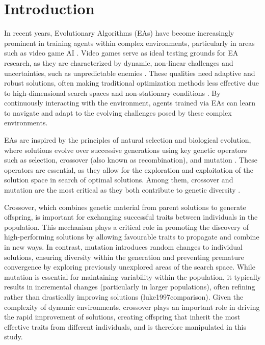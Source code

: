 
\section{Introduction}\label{sec:introduction}
In recent years, Evolutionary Algorithms (EAs) have become increasingly prominent in training agents within complex environments, particularly in areas such as video game AI \cite{lucas2006evolutionary}.
Video games serve as ideal testing grounds for EA research, as they are characterized by dynamic, non-linear challenges and uncertainties, such as unpredictable enemies \cite{togelius2007computational, togelius2009super}.
These qualities need adaptive and robust solutions, often making traditional optimization methods less effective due to high-dimensional search spaces and non-stationary conditions \cite{yannakakis2018AIgames}.
By continuously interacting with the environment, agents trained via EAs can learn to navigate and adapt to the evolving challenges posed by these complex environments.

EAs are inspired by the principles of natural selection and biological evolution, where solutions evolve over successive generations using key genetic operators such as selection, crossover (also known as recombination), and mutation \cite{eiben2015bookEA}.
These operators are essential, as they allow for the exploration and exploitation of the solution space in search of optimal solutions.
Among them, crossover and mutation are the most critical as they both contribute to genetic diversity \cite{luke1997comparison}.

Crossover, which combines genetic material from parent solutions to generate offspring, is important for exchanging successful traits between individuals in the population.
This mechanism plays a critical role in promoting the discovery of high-performing solutions by allowing favourable traits to propagate and combine in new ways.
In contrast, mutation introduces random changes to individual solutions, ensuring diversity within the generation and preventing premature convergence by exploring previously unexplored areas of the search space.
While mutation is essential for maintaining variability within the population, it typically results in incremental changes (particularly in larger populations), often refining rather than drastically improving solutions (luke1997comparison).
Given the complexity of dynamic environments, crossover plays an important role in driving the rapid improvement of solutions, creating offspring that inherit the most effective traits from different individuals, and is therefore manipulated in this study.

